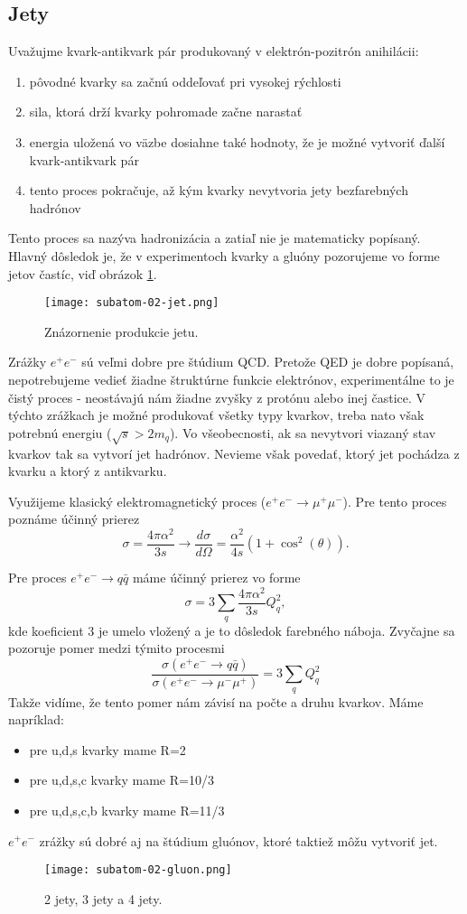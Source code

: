\documentclass[../../main.tex]{subfiles}
\begin{document}
\subsection{Jety}
Uvažujme kvark-antikvark pár produkovaný v elektrón-pozitrón anihilácii:
\begin{enumerate}
\item pôvodné kvarky sa začnú oddeľovať pri vysokej rýchlosti
\item sila, ktorá drží kvarky pohromade začne narastať 
\item energia uložená vo väzbe dosiahne také hodnoty, že je možné vytvoriť ďalší kvark-antikvark pár
\item tento proces pokračuje, až kým kvarky nevytvoria jety bezfarebných hadrónov
\end{enumerate}
Tento proces sa nazýva hadronizácia a zatiaľ nie je matematicky popísaný. Hlavný dôsledok je, že v experimentoch kvarky a gluóny pozorujeme vo forme jetov častíc, viď obrázok \ref{sf2:fig:jet}.

\begin{figure}[!h]
\texttt{[image: subatom-02-jet.png]}
\centering
\caption{Znázornenie produkcie jetu.}
\label{sf2:fig:jet}
\end{figure}

Zrážky $e^+e^-$ sú veľmi dobre pre štúdium QCD. Pretože QED je dobre popísaná, nepotrebujeme vedieť žiadne štruktúrne funkcie elektrónov, experimentálne to je čistý proces - neostávajú nám žiadne zvyšky z protónu alebo inej častice.
V týchto zrážkach je možné produkovať všetky typy kvarkov, treba nato však potrebnú energiu ($\sqrt{s}>2m_q$). Vo všeobecnosti, ak sa nevytvori viazaný stav kvarkov tak sa vytvorí jet hadrónov. Nevieme však povedať, ktorý jet pochádza z kvarku a ktorý z antikvarku. 

Využijeme klasický elektromagnetický proces ($e^+e^- \rightarrow \mu^+ \mu^-$).  Pre tento proces poznáme účinný prierez 
$$ \sigma = \frac{4\pi \alpha^2}{3s} \rightarrow \frac{d\sigma}{d\Omega} = \frac{\alpha^2}{4s}(1+\cos^2(\theta)).$$

Pre proces $e^+e^- \rightarrow q \bar{q}$ máme účinný prierez vo forme
$$ \sigma = 3 \sum_q \frac{4\pi \alpha^2}{3s} Q^2_q,$$ 
kde koeficient 3 je umelo vložený a je to dôsledok farebného náboja. Zvyčajne sa pozoruje pomer medzi týmito procesmi 
$$ \frac{\sigma(e^+e^- \rightarrow q\bar{q})}{\sigma(e^+e^- \rightarrow \mu^-\mu^+)} = 3 \sum_q Q^2_q $$
Takže vidíme, že tento pomer nám závisí na počte a druhu kvarkov. Máme napríklad:
\begin{itemize}
\item pre u,d,s kvarky mame R=2
\item pre u,d,s,c kvarky mame R=10/3
\item pre u,d,s,c,b kvarky mame R=11/3
\end{itemize}

$e^+e^-$ zrážky sú dobré aj na štúdium gluónov, ktoré taktiež môžu vytvoriť jet. 

\begin{figure}[!h]
\texttt{[image: subatom-02-gluon.png]}
\centering
\caption{2 jety, 3 jety a 4 jety.}
\label{sf2:fig:gluon}
\end{figure}
\end{document}
